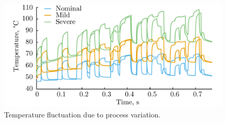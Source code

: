 \begin{figure}[bl]
  \vspace{-1.0em}
  \centering
  \includegraphics[width=1.0\linewidth]{include/assets/motivation-temperature.pdf}
  \caption{Temperature fluctuation due to process variation.}
\end{figure}
